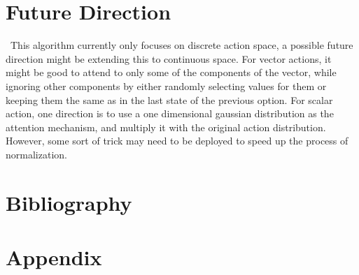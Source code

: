 \documentclass{article}
\begin{document}
	\section{Future Direction}
	\qquad \ This algorithm currently only focuses on discrete action space, a possible future direction might be extending this to continuous space. For vector actions, it might be good to attend to only some of the components of the vector, while ignoring other components by either randomly selecting values for them or keeping them the same as in the last state of the previous option. For scalar action, one direction is to use a one dimensional gaussian distribution as the attention mechanism, and multiply it with the original action distribution. However, some sort of trick may need to be deployed to speed up the process of normalization.
	\section*{Bibliography}
	
	
		
	\section*{Appendix}
	\appendix
\end{document}
